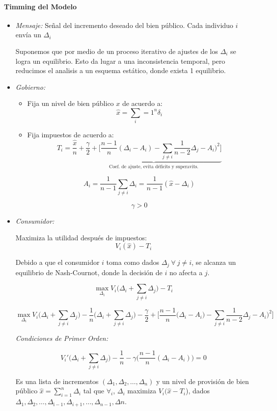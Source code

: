 \paragraph{Timming del Modelo}
\begin{itemize}
	\item \emph{Mensaje:} Señal del incremento deseado del bien público. Cada individuo $i$ envía un $\Delta_i$
	
	Suponemos que por medio de un proceso iterativo de ajustes de los $\Delta_i$ se logra un equilibrio. Esto da lugar a una inconsistencia temporal, pero reducimos el analisis a un esquema estático, donde exista 1 equilibrio.
	
	\item \emph{Gobierno:} 

	\begin{itemize}
		\item Fija un nivel de bien público $x$ de acuerdo a:
		$$\hat{x}=\sum_i=1^{n} \delta_i$$
		\item Fija impuestos de acuerdo a:
		$$T_i= \frac{\hat{x}}{n}+\underbrace{\frac{\gamma}{2}+ \bigg[ \frac{n-1}{n}\left(\Delta_i-A_i\right)-\sum_{j \neq i}\frac{1}{n-2}\Delta_j-A_i)^2 \bigg] }_{\mbox{Coef. de ajuste, evita déficits y superavits.}}$$

		$$A_i=\frac{1}{n-1}\sum_{j \neq i}\Delta_i=\frac{1}{n-1}\left(\hat{x}-\Delta_i\right)$$

		$$\gamma > 0$$
	\end{itemize}

	\item \emph{Consumidor:}

	Maximiza la utilidad después de impuestos:
	$$V_i(\hat{x})-T_i$$

	Debido a que el consumidor $i$ toma como dados $\Delta_j \: \forall \:j \neq i$, se alcanza un equilibrio de Nash-Cournot, donde la decisión de $i$ no afecta a $j$.

	$$\max_{\Delta_i} V_i \bigg(\Delta_i+\sum_{j \neq i} \Delta_j \bigg)-T_i $$

	$$\max_{\Delta_i} V_i\bigg(\Delta_i+\sum_{j \neq i}\Delta_j \bigg)-\frac{1}{n}\bigg(\Delta_i+\sum_{j \neq i}\Delta_j \bigg)-\frac{\gamma}{2}+\Bigg[\frac{n-1}{n}\bigg(\Delta_i-A_i\bigg)-\sum_{j \neq i}\frac{1}{n-2}\Delta_j-A_i)^2 \Bigg]  $$

	\emph{Condiciones de Primer Orden:}
	
	$$V_i ' \bigg(\Delta_i+\sum_{j\neq i}\Delta_j \bigg) - \frac{1}{n} - \gamma \bigg( \frac{n-1}{n}( \Delta_i-A_i ) \bigg)=0$$
	
	\begin{defi}
	Es una lista de incrementos $(\Delta_1, \Delta_2,\ldots,\Delta_n)$ y un nivel de provisión de bien público $\hat{x}=\sum_{i=1}^{n}\Delta_i$ tal que $\forall_i$, $\Delta_i$ maximiza $V_i(\hat{x}-T_i$), dados $\Delta_1, \Delta_2, \ldots,\Delta_{î-1}, \Delta_{i+1},\ldots, \Delta_{n-1}, \Delta{n}$.
	\end{defi}
\end{itemize}

